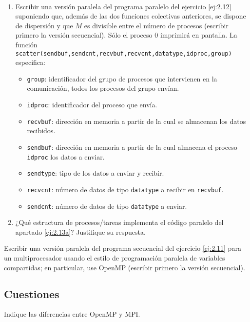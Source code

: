 \begin{ejercicio}~
    \begin{enumerate}
        \item\label{ej:2.13a} Escribir una versión paralela del programa paralelo del ejercicio \ref{ej:2.12} suponiendo que, además de las
        dos funciones colectivas anteriores, se dispone de dispersión y que $M$ es divisible entre el número de
        procesos (escribir primero la versión secuencial). Sólo el proceso 0 imprimirá en pantalla. La función
        \verb|scatter(sendbuf,sendcnt,recvbuf,recvcnt,datatype,idproc,group)| especifica:
        \begin{itemize}
            \item \verb|group|: identificador del grupo de procesos que intervienen en la comunicación, todos los procesos
            del grupo envían.
            \item \verb|idproc|: identificador del proceso que envía.
            \item \verb|recvbuf|: dirección en memoria a partir de la cual se almacenan los datos recibidos.
            \item \verb|sendbuf|: dirección en memoria a partir de la cual almacena el proceso \verb|idproc| los datos a enviar.
            \item \verb|sendtype|: tipo de los datos a enviar y recibir.
            \item \verb|recvcnt|: número de datos de tipo \verb|datatype| a recibir en \verb|recvbuf|.
            \item \verb|sendcnt|: número de datos de tipo \verb|datatype| a enviar.
        \end{itemize}

        \item ¿Qué estructura de procesos/tareas implementa el código paralelo del apartado \ref{ej:2.13a}? Justifique su respuesta.
    \end{enumerate}
\end{ejercicio}

\begin{ejercicio}
    Escribir una versión paralela del programa secuencial del ejercicio \ref{ej:2.11} para un multiprocesador
    usando el estilo de programación paralela de variables compartidas; en particular, use OpenMP (escribir
    primero la versión secuencial).
\end{ejercicio}

\subsection{Cuestiones}
\begin{cuestion}
    Indique las diferencias entre OpenMP y MPI.
\end{cuestion}

